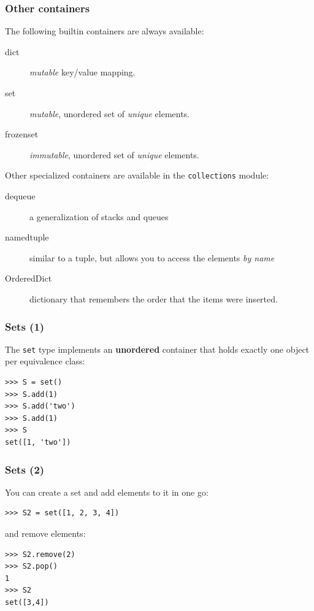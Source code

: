 \documentclass[english,serif,mathserif,xcolor=pdftex,dvipsnames,table]{beamer}
\begin{document}
\begin{frame}
  \frametitle{Other containers}

  The following builtin containers are always available:
  \begin{description}
  \item[dict] \textit{mutable} key/value mapping.
  \item[set] \textit{mutable}, unordered set of \textit{unique} elements.
  \item[frozenset] \textit{immutable}, unordered set of
    \textit{unique} elements.
  \end{description}

  \pause
  Other specialized containers are available in the
  \texttt{collections} module:

  \begin{description}
  \item[dequeue] a generalization of stacks and queues
  \item[namedtuple] similar to a tuple, but allows you to access the
    elements \textit{by name}
  \item[OrderedDict] dictionary that remembers the order that the
    items were inserted.
  \end{description}
\end{frame}


\begin{frame}[fragile]
  \frametitle{Sets (1)} The \texttt{set} type implements an
  \textbf{unordered} container that holds exactly one object per
  equivalence class:
\begin{lstlisting}
>>> S = set()
>>> S.add(1)
>>> S.add('two')
>>> S.add(1)
>>> S
set([1, 'two'])
\end{lstlisting}

\end{frame}


\begin{frame}[fragile]
  \frametitle{Sets (2)}
You can create a set and add elements to it in one go:
\begin{lstlisting}
>>> S2 = set([1, 2, 3, 4])
\end{lstlisting}

and remove elements:

\begin{lstlisting}
>>> S2.remove(2)
>>> S2.pop()
1
>>> S2
set([3,4])
\end{lstlisting}
\end{frame}
\end{document}
